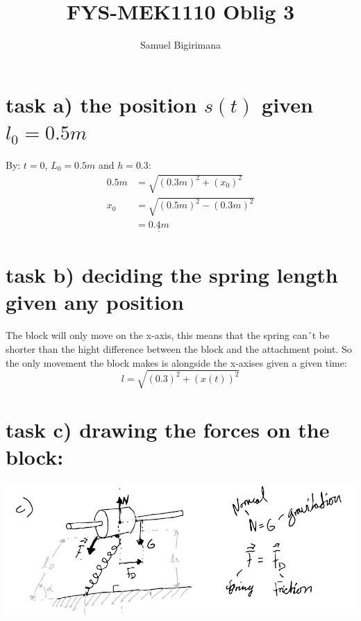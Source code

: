 \documentclass{article}
\title{FYS-MEK1110 Oblig 3}
\author{Samuel Bigirimana}
\begin{document}
    \maketitle
    \raggedright
    \section*{task a) the position \(s(t)\) given \(l_0 = 0.5m\)}
    By: \(t = 0 \), \(L_0 = 0.5m \) and \(h = 0.3\):
    \begin{equation*}
        \begin{split}
            0.5m &= \sqrt{(0.3m)^2+(x_0)^2} \\
               x_0 &= \sqrt{(0.5m)^2-(0.3m)^2} \\
                    &= \underline{\underline{0.4m}}
        \end{split}
    \end{equation*}

    \section*{task b) deciding the spring length given any position}
    The block will only move on the x-axis, this means that the spring can´t 
    be shorter than the hight difference between the block and the attachment point. 
    So the only movement the block makes is alongside the x-axises given a given time: \linebreak
    \begin{equation*}
        l = \sqrt{(0.3)^2+(x(t))^2}
    \end{equation*}

    \section*{task c) drawing the forces on the block:}
    \begin{center}
        \includegraphics[scale=0.8]{../c.png}\linebreak
    \end{center}
\end{document}
